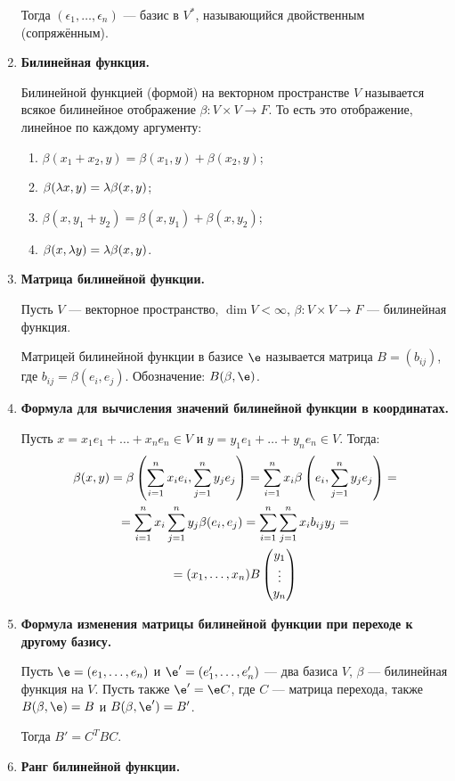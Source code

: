 \begin{enumerate}
Тогда $(\epsilon_1, \ldots, \epsilon_n)$ --- базис в $V^*$, называющийся двойственным (сопряжённым).
\item \textbf{Билинейная функция.}

Билинейной функцией (формой) на векторном пространстве $V$ называется всякое билинейное отображение $\beta \colon V \times V \rightarrow F$. То есть это отображение, линейное по каждому аргументу:
\begin{enumerate}
\item $\beta(x_1 + x_2, y) = \beta(x_1, y) + \beta(x_2, y)$; 
\item $\beta(\lambda x, y) = \lambda\beta(x, y)$;
\item $\beta(x, y_1 + y_2) = \beta(x, y_1) + \beta(x, y_2)$;
\item $\beta(x, \lambda y) = \lambda\beta(x, y)$.
\end{enumerate}
\item \textbf{Матрица билинейной функции.}

Пусть $V$ --- векторное пространство, $\dim V < \infty$, $\beta \colon V \times V \rightarrow F$ --- билинейная функция.

Матрицей билинейной функции в базисе $\e$ называется матрица $B = (b_{ij})$, где $b_{ij} = \beta(e_i, e_j)$. Обозначение: $B(\beta, \e)$.
\item \textbf{Формула для вычисления значений билинейной функции в координатах.}

Пусть $x = x_1e_1 + \ldots + x_ne_n \in V$ и $y = y_1e_1 + \ldots + y_ne_n \in V$. Тогда:
\begin{gather*}
\beta(x, y) = \beta\left(\sum_{i = 1}^{n}x_ie_i, \sum_{j = 1}^{n}y_je_j\right) = \sum_{i = 1}^{n} x_i\beta\left(e_i, \sum_{j = 1}^{n}y_je_j\right) = \\
= \sum_{i = 1}^{n}x_i\sum_{j = 1}^{n}y_j\beta(e_i, e_j) = \sum_{i = 1}^{n}\sum_{j = 1}^{n}x_ib_{ij}y_j = \\
= (x_1, \ldots, x_n)B \begin{pmatrix}{y}_1 \\\vdots\\{y}_n\end{pmatrix}
\end{gather*}
\item \textbf{Формула изменения матрицы билинейной функции при переходе к другому базису.} 

Пусть $\e = (e_1, \ldots, e_n)$ и $\e' = (e'_1, \ldots, e'_n)$ --- два базиса $V$, $\beta$ --- билинейная функция на $V$. Пусть также $\e' = \e C$, где $C$ --- матрица перехода, также $B(\beta, \e) = B$ и $B(\beta, \e') = B'$.

Тогда $B' = C^TBC$.
\item \textbf{Ранг билинейной функции.}


\end{enumerate}

